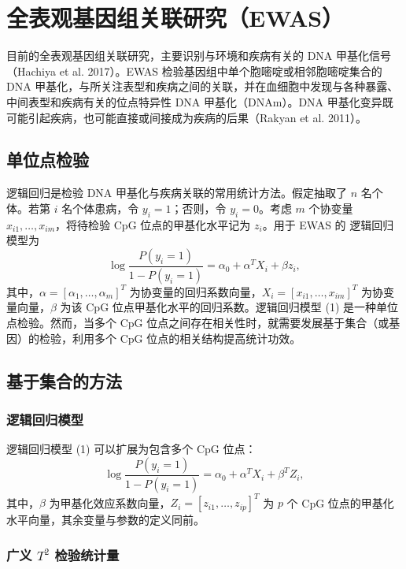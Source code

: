 \FloatBarrier
\section{全表观基因组关联研究（EWAS）}

目前的全表观基因组关联研究，主要识别与环境和疾病有关的 DNA 甲基化信号（Hachiya et al. 2017）。EWAS 检验基因组中单个胞嘧啶或相邻胞嘧啶集合的 DNA 甲基化，与所关注表型和疾病之间的关联，并在血细胞中发现与各种暴露、中间表型和疾病有关的位点特异性 DNA 甲基化（DNAm）。DNA 甲基化变异既可能引起疾病，也可能直接或间接成为疾病的后果（Rakyan et al. 2011）。

\subsection{单位点检验}

逻辑回归是检验 DNA 甲基化与疾病关联的常用统计方法。假定抽取了 $n$ 名个体。若第 $i$ 名个体患病，令 $y_i=1$；否则，令 $y_i=0$。考虑 $m$ 个协变量 $x_{i1},\ldots,x_{im}$，将待检验 CpG 位点的甲基化水平记为 $z_i$。用于 EWAS 的 逻辑回归模型为
\begin{equation}
\log\frac{P(y_i=1)}{1-P(y_i=1)}=\alpha_0+\alpha^T X_i+\beta z_i,
\tag{5.1}
\end{equation}
其中，$\alpha=[\alpha_1,\ldots,\alpha_m]^T$ 为协变量的回归系数向量，$X_i=[x_{i1},\ldots,x_{im}]^T$ 为协变量向量，$\beta$ 为该 CpG 位点甲基化水平的回归系数。逻辑回归模型 (1) 是一种单位点检验。然而，当多个 CpG 位点之间存在相关性时，就需要发展基于集合（或基因）的检验，利用多个 CpG 位点的相关结构提高统计功效。

\subsection{基于集合的方法}
\subsubsection{逻辑回归模型}

逻辑回归模型 (1) 可以扩展为包含多个 CpG 位点：
\begin{equation}
\log\frac{P(y_i=1)}{1-P(y_i=1)}=\alpha_0+\alpha^TX_i+\beta^TZ_i,
\tag{5.2}
\end{equation}
其中，$\beta$ 为甲基化效应系数向量，$Z_i=[z_{i1},\ldots,z_{ip}]^T$ 为 $p$ 个 CpG 位点的甲基化水平向量，其余变量与参数的定义同前。

\subsubsection{广义 \texorpdfstring{$T^2$}{T²} 检验统计量}

